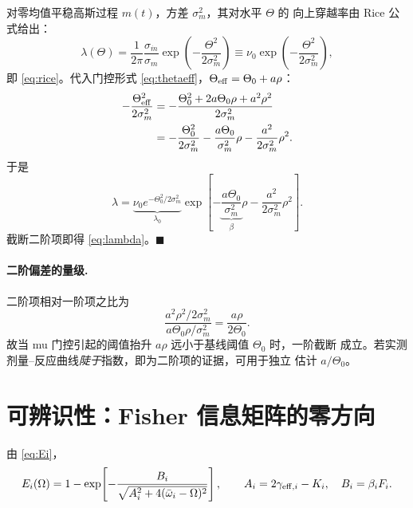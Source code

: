 对零均值平稳高斯过程 $m(t)$，方差 $\sigma_{m}^{2}$，其对水平 $\Theta$ 的
向上穿越率由 Rice 公式给出：
%
\begin{equation}
\lambda(\Theta)=\frac{1}{2\pi}\frac{\sigma_{\dot m}}{\sigma_{m}}
\exp\!\left(-\frac{\Theta^{2}}{2\sigma_{m}^{2}}\right)
\equiv\nu_{0}\exp\!\left(-\frac{\Theta^{2}}{2\sigma_{m}^{2}}\right),
\end{equation}
%
即 \cref{eq:rice}。代入门控形式 \cref{eq:thetaeff}，$\Theta_{\mathrm{eff}}=\Theta_{0}+a\rho$：
%
\begin{align}
-\frac{\Theta_{\mathrm{eff}}^{2}}{2\sigma_{m}^{2}}
&=-\frac{\Theta_{0}^{2}+2a\Theta_{0}\rho+a^{2}\rho^{2}}{2\sigma_{m}^{2}}\notag\\
&=-\frac{\Theta_{0}^{2}}{2\sigma_{m}^{2}}
  -\frac{a\Theta_{0}}{\sigma_{m}^{2}}\rho
  -\frac{a^{2}}{2\sigma_{m}^{2}}\rho^{2} .
\end{align}
%
于是
%
\begin{equation}
\lambda=\underbrace{\nu_{0}e^{-\Theta_{0}^{2}/2\sigma_{m}^{2}}}_{\lambda_{0}}
\exp\!\left[-\underbrace{\frac{a\Theta_{0}}{\sigma_{m}^{2}}}_{\beta}\rho
            -\frac{a^{2}}{2\sigma_{m}^{2}}\rho^{2}\right].
\label{eq:app-lambda-full}
\end{equation}
%
截断二阶项即得 \cref{eq:lambda}。\hfill$\blacksquare$

\paragraph{二阶偏差的量级.}
二阶项相对一阶项之比为
%
\begin{equation}
\frac{a^{2}\rho^{2}/2\sigma_{m}^{2}}{a\Theta_{0}\rho/\sigma_{m}^{2}}
=\frac{a\rho}{2\Theta_{0}} .
\end{equation}
%
故当 mu 门控引起的阈值抬升 $a\rho$ 远小于基线阈值 $\Theta_{0}$ 时，一阶截断
成立。若实测剂量--反应曲线\emph{陡于}指数，即为二阶项的证据，可用于独立
估计 $a/\Theta_{0}$。

\section{可辨识性：Fisher 信息矩阵的零方向}
\label{app:ident}

由 \cref{eq:Ei}，
%
\begin{equation}
E_i(\Omega)=1-\exp\!\left[-\frac{B_i}{\sqrt{A_i^{2}+4(\bar{\omega}_i-\Omega)^{2}}}\right],
\qquad
A_i=2\gamma_{\mathrm{eff},i}-K_i,\quad B_i=\beta_iF_i .
\end{equation}

